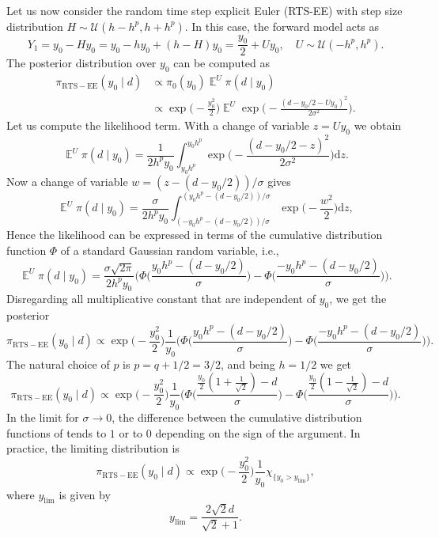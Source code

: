 \documentclass{siamart1116}
\numberwithin{theorem}{section}
\newcommand{\E}{\operatorname{\mathbb{E}}}
\newcommand{\dd}{\mathrm{d}}
\begin{document}
Let us now consider the random time step explicit Euler (RTS-EE) with step size distribution $H \sim \mathcal U(h - h^p, h + h^p)$. In this case, the forward model acts as
\[
	Y_1 = y_0 - H y_0 = y_0 - h y_0 + (h - H) y_0 = \frac{y_0}{2}  + Uy_0, \quad U \sim \mathcal U (-h^p, h^p).
\]
The posterior distribution over $y_0$ can be computed as
\begin{align*}
	\pi_{\mathrm{RTS-EE}}(y_0 \mid d) &\propto \pi_0(y_0) \E^U\pi(d \mid y_0) \\
	&\propto \exp\Big(-\frac{y_0^2}{2}\Big) \E^U \exp\Big(-\frac{(d - y_0/2 - Uy_0)^2}{2\sigma^2}\Big).
\end{align*}
Let us compute the likelihood term. With a change of variable $z = Uy_0$ we obtain
\begin{equation*}
	\E^U\pi(d \mid y_0) = \frac{1}{2h^p y_0}\int_{y_0 h^p}^{y_0 h^p} \exp\Big(-\frac{(d - y_0/2 - z)^2}{2\sigma^2}\Big) \dd z.
\end{equation*}
Now a change of variable $w = (z - (d - y_0/2)) / \sigma$ gives
\begin{equation*}
	\E^U\pi(d \mid y_0) = \frac{\sigma}{2h^p y_0}\int_{(-y_0 h^p - (d - y_0/2)) / \sigma}^{(y_0 h^p - (d - y_0/2)) / \sigma} \exp\Big(-\frac{w^2}{2}\Big) \dd z,
\end{equation*}
Hence the likelihood can be expressed in terms of the cumulative distribution function $\Phi$ of a standard Gaussian random variable, i.e.,
\begin{equation*}
	\E^U\pi(d \mid y_0) = \frac{\sigma\sqrt{2\pi}}{2h^p y_0} \Big(\Phi\Big(\frac{y_0 h^p - (d - y_0/2)}{\sigma}\Big) - \Phi\Big(\frac{-y_0 h^p - (d - y_0/2)}{\sigma}\Big) \Big).
\end{equation*}
Disregarding all multiplicative constant that are independent of $y_0$, we get the posterior
\[
	\pi_{\mathrm{RTS-EE}}(y_0 \mid d) \propto \exp\Big(-\frac{y_0^2}{2}\Big) \frac{1}{y_0} \Big(\Phi\Big(\frac{y_0 h^p - (d - y_0/2)}{\sigma}\Big) - \Phi\Big(\frac{-y_0 h^p - (d - y_0/2)}{\sigma}\Big) \Big).
\]
The natural choice of $p$ is $p = q + 1/2 = 3/2$, and being $h = 1/2$ we get
\[
	\pi_{\mathrm{RTS-EE}}(y_0 \mid d) \propto \exp\Big(-\frac{y_0^2}{2}\Big) \frac{1}{y_0} \Big(\Phi\Big(\frac{\frac{y_0}{2} (1 + \frac{1}{\sqrt{2}}) - d}{\sigma}\Big) 
																							  - \Phi\Big(\frac{\frac{y_0}{2} (1 - \frac{1}{\sqrt{2}}) - d}{\sigma}\Big) \Big).
\]
In the limit for $\sigma \to 0$, the difference between the cumulative distribution functions of tends to $1$ or to $0$ depending on the sign of the argument. In practice, the limiting distribution is
\[
	\pi_{\mathrm{RTS-EE}}(y_0 \mid d) \propto \exp\Big(-\frac{y_0^2}{2}\Big)\frac{1}{y_0} \chi_{\{y_0 > y_{\mathrm{lim}}\}},
\]
where $y_{\mathrm{lim}}$ is given by
\[
	y_{\mathrm{lim}} = \frac{2\sqrt{2}d}{\sqrt{2} + 1}.
\]
\end{document}
